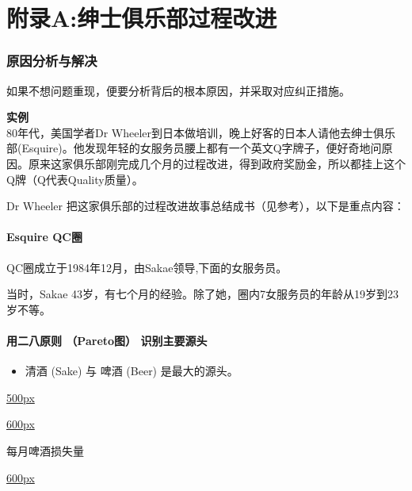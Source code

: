 \chapter{附录A:绅士俱乐部过程改进} %

\hypertarget{ux539fux56e0ux5206ux6790ux4e0eux89e3ux51b3}{%
\subsection{原因分析与解决}\label{ux539fux56e0ux5206ux6790ux4e0eux89e3ux51b3}}

如果不想问题重现，便要分析背后的根本原因，并采取对应纠正措施。

\textbf{实例}\\
80年代，美国学者Dr
Wheeler到日本做培训，晚上好客的日本人请他去绅士俱乐部(Esquire)。他发现年轻的女服务员腰上都有一个英文Q字牌子，便好奇地问原因。原来这家俱乐部刚完成几个月的过程改进，得到政府奖励金，所以都挂上这个Q牌（Q代表Quality质量）。

Dr Wheeler
把这家俱乐部的过程改进故事总结成书（见参考），以下是重点内容：

\hypertarget{esquire-qcux5708}{%
\subsubsection{Esquire QC圈}\label{esquire-qcux5708}}

QC圈成立于1984年12月，由Sakae领导,下面的女服务员。

当时，Sakae
43岁，有七个月的经验。除了她，圈内7女服务员的年龄从19岁到23岁不等。

\hypertarget{ux7528ux4e8cux516bux539fux5219-paretoux56fe-ux8bc6ux522bux4e3bux8981ux6e90ux5934}{%
\subsubsection{用二八原则 （Pareto图）
识别主要源头}\label{ux7528ux4e8cux516bux539fux5219-paretoux56fe-ux8bc6ux522bux4e3bux8981ux6e90ux5934}}

\begin{itemize}
\tightlist
\item
  清酒 (Sake) 与 啤酒 (Beer) 是最大的源头。
\end{itemize}

\href{文件:附录a表1.jpg}{500px}

\href{文件:club6.1.jpg}{600px}

每月啤酒损失量

\href{文件:club7.1.jpg}{600px}

